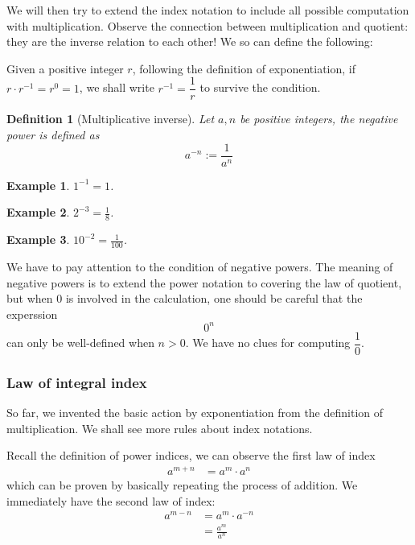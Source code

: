 \documentclass[12pt]{article}
\newtheorem{definition}{Definition}[section]
\newtheorem*{example}{Example}
\begin{document}
    We will then try to extend the index notation to include all possible computation with multiplication. Observe the connection between multiplication and quotient: they are the inverse relation to each other! We so can define the following:

    Given a positive integer $r$, following the definition of exponentiation, if $r\cdot r^{-1} = r^0 = 1$, we shall write $r^{-1}=\dfrac{1}{r}$ to survive the condition.

    \begin{definition}[Multiplicative inverse]
        Let $a, n$ be positive integers, the negative power is defined as $$a^{-n} := \frac{1}{a^n}$$
    \end{definition}

    \begin{example}
        $1^{-1}=1$.
    \end{example}

    \begin{example}
        $2^{-3}=\frac{1}{8}$.
    \end{example}

    \begin{example}
        $10^{-2}=\frac{1}{100}$.
    \end{example}

    We have to pay attention to the condition of negative powers. The meaning of negative powers is to extend the power notation to covering the law of quotient, but when 0 is involved in the calculation, one should be careful that the experssion $$0^n$$ can only be well-defined when $n>0$. We have no clues for computing $\dfrac{1}{0}$.

    \subsubsection*{Law of integral index}

    So far, we invented the basic action by exponentiation from the definition of multiplication. We shall see more rules about index notations.

    Recall the definition of power indices, we can observe the first law of index \begin{align*}
        a^{m+n}&=a^m \cdot a^n
    \end{align*} which can be proven by basically repeating the process of addition. We immediately have the second law of index:\begin{align*}
        a^{m-n}&=a^m\cdot a^{-n}\\
        &=\frac{a^m}{a^n}
    \end{align*}
\end{document}
